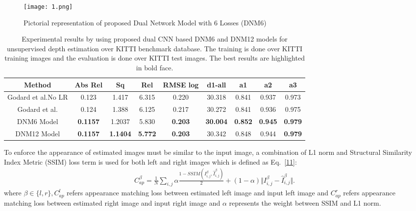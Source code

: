 \documentclass[10pt,twocolumn,letterpaper]{article}
\begin{document}
\begin{figure*}
\begin{center}
  \texttt{[image: 1.png]}\\
  \caption{Pictorial representation of proposed Dual Network Model with 6 Losses (DNM6)}\label{1}
\end{center}
\end{figure*}
\begin{table*}
\small
\renewcommand\arraystretch{1.2}
\centering
\begin{tabular}{|c|c|c|c|c|c|c|c|c|}
\hline
Method & Abs Rel & Sq & Rel & RMSE log & d1-all & a1 & a2 & a3\\
\hline
Godard et al.\cite{Godard2017Unsupervised}No LR & 0.123 & 1.417 & 6.315 & 0.220 & 30.318 & 0.841 & 0.937 & 0.973 \\
Godard et al. \cite{Godard2017Unsupervised} & 0.124 & 1.388 & 6.125 & 0.217 & 30.272 & 0.841 & 0.936 & 0.975 \\
DNM6 Model & \textbf{0.1157} & 1.2037 & 5.830 & \textbf{0.203} & \textbf{30.004} & \textbf{0.852} & \textbf{0.945} & \textbf{0.979} \\
DNM12 Model & \textbf{0.1157} & \textbf{1.1404} & \textbf{5.772} & \textbf{0.203} & 30.342 & 0.848 & 0.944 & \textbf{0.979} \\
\hline
\end{tabular} 
\caption{Experimental results by using proposed dual CNN based DNM6 and DNM12 models for unsupervised depth estimation over KITTI benchmark database. The training is done over KITTI training images and the evaluation is done over KITTI test images. The best results are highlighted in bold face.}
\label{tab1}
\end{table*}
\par
To enforce the appearance of estimated images must be similar to the input image, a combination of L1 norm and Structural Similarity Index Metric (SSIM) loss term is used for both left and right images which is defined as Eq.~\ref{11}:
\begin{equation}\label{11}
\begin{split}
C^\beta_{ap}=\frac{1}{N}\sum_{i,j}\alpha\frac{1-SSIM(I^\beta_{i,j},\hat{I}^\beta_{i,j})}{2}+(1-\alpha)\Vert I^\beta_{i,j}-\hat{I}^\beta_{i,j}\Vert.
\end{split}
\end{equation}
where $\beta\in\{l,r\}, C^l_{ap}$ refers appearance matching loss between estimated left image and input left image and $C^r_{ap}$ refers appearance matching loss between estimated right image and input right image and $\alpha$ represents the weight between SSIM and L1 norm.
\end{document}
